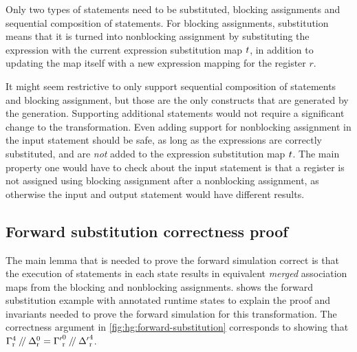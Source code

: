 \begin{definition}%
  \label{def:substitute-statements}

  Only two types of statements need to be substituted, blocking assignments and
  sequential composition of statements.  For blocking assignments, substitution
  means that it is turned into nonblocking assignment by substituting the
  expression with the current expression substitution map $t$, in
  addition to updating the map itself with a new expression mapping for the
  register $r$.

\end{definition}

It might seem restrictive to only support sequential composition of statements
and blocking assignment, but those are the only constructs that are generated by
the \htl{} generation.  Supporting additional statements would not require a
significant change to the transformation.  Even adding support for nonblocking
assignment in the input statement should be safe, as long as the expressions are
correctly substituted, and are \emph{not} added to the expression substitution
map $t$.  The main property one would have to check about the input
statement is that a register is not assigned using blocking assignment after a
nonblocking assignment, as otherwise the input and output statement would have
different results.

\subsection{Forward substitution correctness proof}%
\label{sec:hg:forward-substitution-correctness-proof}

The main lemma that is needed to prove the forward simulation correct is that
the execution of statements in each state results in equivalent \emph{merged}
association maps from the blocking and nonblocking assignments.
 shows the forward substitution example with
annotated runtime states to explain the proof and invariants needed to prove the
forward simulation for this transformation.  The correctness argument in
\cref{fig:hg:forward-substitution} corresponds to showing that
${\Gamma}^{4}_{\mathrm r} \mathbin{/\kern-2pt/} \Delta^{0}_{\mathrm r} =
{\Gamma'}^{0}_{\mathrm r} \mathbin{/\kern-2pt/} {\Delta'}^4_{\mathrm r}$.

